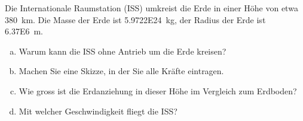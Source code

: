 
\begin{aufgabe}
	Die Internationale Raumstation (ISS) umkreist die Erde in einer Höhe von etwa \SI{380}{km}.
	Die Masse der Erde ist \SI{5.9722E24}{kg}, der Radius der Erde ist \SI{6.37E6}{m}.
	\begin{enumerate} [a)]
\item Warum kann die ISS ohne Antrieb um die Erde kreisen?
\item Machen Sie eine Skizze, in der Sie alle Kräfte eintragen.
\item Wie gross ist die Erdanziehung in dieser Höhe im Vergleich zum Erdboden?
\item Mit welcher Geschwindigkeit fliegt die ISS?
	\end{enumerate}
\end{aufgabe}

